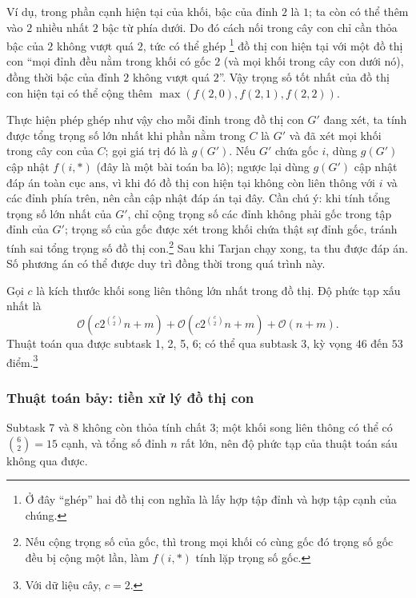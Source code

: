 \documentclass[11pt]{article}
\newcommand{\Oh}{\mathcal{O}}
\begin{document}
Ví dụ, trong phần cạnh hiện tại của khối, bậc của đỉnh \(2\) là \(1\); ta còn
có thể thêm vào \(2\) nhiều nhất \(2\) bậc từ phía dưới. Do đó cách nối trong
cây con chỉ cần thỏa bậc của \(2\) không vượt quá \(2\), tức có thể ghép
\footnote{Ở đây ``ghép'' hai đồ thị con nghĩa là lấy hợp tập đỉnh và hợp tập
cạnh của chúng.} đồ thị con hiện tại với một đồ thị con ``mọi đỉnh đều nằm
trong khối có gốc \(2\) (và mọi khối trong cây con dưới nó), đồng thời bậc của
đỉnh \(2\) không vượt quá \(2\)''. Vậy trọng số tốt nhất của đồ thị con hiện
tại có thể cộng thêm \(\max(f(2,0),f(2,1),f(2,2))\).

Thực hiện phép ghép như vậy cho mỗi đỉnh trong đồ thị con \(G'\) đang xét, ta
tính được tổng trọng số lớn nhất khi phần nằm trong \(C\) là \(G'\) và đã xét
mọi khối trong cây con của \(C\); gọi giá trị đó là \(g(G')\). Nếu \(G'\) chứa
gốc \(i\), dùng \(g(G')\) cập nhật \(f(i,*)\) (đây là một bài toán ba lô);
ngược lại dùng \(g(G')\) cập nhật đáp án toàn cục \(\mathrm{ans}\), vì khi đó
đồ thị con hiện tại không còn liên thông với \(i\) và các đỉnh phía trên, nên
cần cập nhật đáp án tại đây. Cần chú ý: khi tính tổng trọng số lớn nhất của
\(G'\), chỉ cộng trọng số các đỉnh không phải gốc trong tập đỉnh của \(G'\);
trọng số của gốc được xét trong khối chứa thật sự đỉnh gốc, tránh tính sai
tổng trọng số đồ thị con.\footnote{Nếu cộng trọng số của gốc, thì trong mọi
khối có cùng gốc đó trọng số gốc đều bị cộng một lần, làm \(f(i,*)\) tính lặp
trọng số gốc.} Sau khi Tarjan chạy xong, ta thu được đáp án. Số phương án có
thể được duy trì đồng thời trong quá trình này.

Gọi \(c\) là kích thước khối song liên thông lớn nhất trong đồ thị. Độ phức
tạp xấu nhất là
\[
  \Oh\!\left(c2^{\binom{c}{2}}n+m\right)
  +\Oh\!\left(c2^{\binom{c}{2}}n+m\right)
  +\Oh(n+m).
\]
Thuật toán qua được subtask 1, 2, 5, 6; có thể qua subtask 3, kỳ vọng
\(46\) đến \(53\) điểm.\footnote{Với dữ liệu cây, \(c=2\).}

\subsubsection{Thuật toán bảy: tiền xử lý đồ thị con}

Subtask 7 và 8 không còn thỏa tính chất 3; một khối song liên thông có thể có
\(\binom{6}{2}=15\) cạnh, và tổng số đỉnh \(n\) rất lớn, nên độ phức tạp của
thuật toán sáu không qua được.
\end{document}
